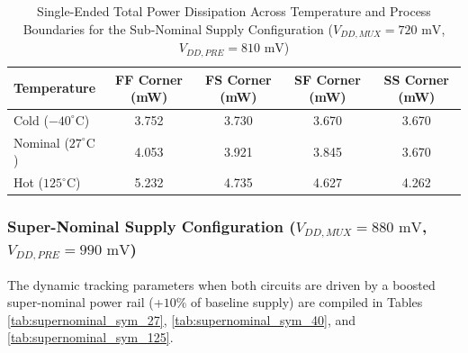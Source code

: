 \begin{table}[H]
    \centering
    \renewcommand{\arraystretch}{1.3}
    \setlength{\tabcolsep}{10pt}
    \small
    \begin{tabular}{|l|c|c|c|c|}
        \hline
        \textbf{Temperature} & \textbf{FF Corner (mW)} & \textbf{FS Corner (mW)} & \textbf{SF Corner (mW)} & \textbf{SS Corner (mW)} \\ \hline
        Cold ($-40^\circ\text{C}$) & 3.752 & 3.730 & 3.670 & 3.670 \\ \hline
        Nominal ($27^\circ\text{C}$) & 4.053 & 3.921 & 3.845 & 3.670 \\ \hline
        Hot ($125^\circ\text{C}$) & 5.232 & 4.735 & 4.627 & 4.262 \\ \hline
    \end{tabular}
    \vspace{2mm}
    \caption{Single-Ended Total Power Dissipation Across Temperature and Process Boundaries for the Sub-Nominal Supply Configuration ($V_{DD,MUX} = 720\text{ mV}$, $V_{DD,PRE} = 810\text{ mV}$)}
    \label{tab:subnominal_power_summary}
\end{table}

\clearpage

\subsubsection*{ Super-Nominal Supply Configuration ($V_{DD,MUX} = 880\text{ mV}$, $V_{DD,PRE} = 990\text{ mV}$)}

The dynamic tracking parameters when both circuits are driven by a boosted super-nominal power rail (+$10\%$ of baseline supply) are compiled in Tables \ref{tab:supernominal_sym_27}, \ref{tab:supernominal_sym_40}, and \ref{tab:supernominal_sym_125}.

